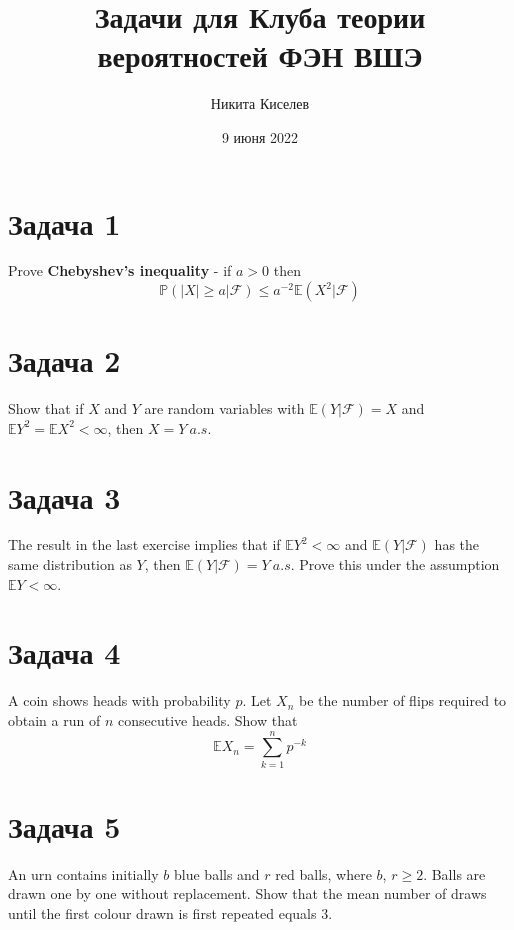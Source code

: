 \documentclass[a4paper, 12pt]{article}
\title{Задачи для Клуба теории вероятностей ФЭН ВШЭ}
\author{Никита Киселев}
\date{9 июня 2022}
\renewcommand{\P}{\mathbb{P}}
\renewcommand{\F}{\mathcal{F}}
\begin{document}
\maketitle

\section*{Задача 1}
Prove \textbf{Chebyshev’s inequality} - if $a>0$ then
$$\P(|X|\geqslant a|\F)\leqslant a^{-2}\mathbb{E}(X^2|\F)$$


\section*{Задача 2}
Show that if $X$ and $Y$ are random variables with $\mathbb{E}(Y|\F)=X$ and $\mathbb{E}Y^2=\mathbb{E}X^2<\infty$, then $X=Y \: a.s.$


\section*{Задача 3\dagger}
The result in the last exercise implies that if $\mathbb{E}Y^2<\infty$ and
$\mathbb{E}(Y|\F)$ has the same distribution as $Y$, then $\mathbb{E}(Y|\F)=Y \: a.s.$ Prove this under the assumption $\mathbb{E}Y<\infty$.


\section*{Задача 4}
A coin shows heads with probability $p$. Let $X_n$ be the number of flips required to obtain a run of $n$ consecutive heads. Show that
$$\mathbb{E}X_n=\sum\limits_{k=1}^np^{-k}$$

\section*{Задача 5}
An urn contains initially $b$ blue balls and $r$ red balls, where $b$, $r\geqslant2$. Balls are drawn one by one
without replacement. Show that the mean number of draws until the first colour drawn is first repeated
equals $3$.
\end{document}
